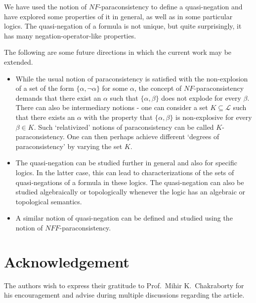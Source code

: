 \documentclass[submission]{eptcs}
\newcommand{\lang}{\mathcal{L}}
\theoremstyle{definition}
\begin{document}
We have used the notion of $NF$-paraconsistency to define a quasi-negation and have explored some properties of it in general, as well as in some particular logics. The quasi-negation of a formula is not unique, but quite surprisingly, it has many negation-operator-like properties.

The following are some future directions in which the current work may be extended.
\begin{itemize}
    \item While the usual notion of paraconsistency is satisfied with the non-explosion of a set of the form $\{\alpha,\neg\alpha\}$ for some $\alpha$, the concept of $NF$-paraconsistency demands that there exist an $\alpha$ such that $\{\alpha,\beta\}$ does not explode for every $\beta$. There can also be intermediary notions - one can consider a set $K\subseteq\lang$ such that there exists an $\alpha$ with the property that $\{\alpha,\beta\}$ is non-explosive for every $\beta\in K$. Such `relativized' notions of paraconsistency can be called $K$-paraconsistency. One can then perhaps achieve different `degrees of paraconsistency' by varying the set $K$.
    \item The quasi-negation can be studied further in general and also for specific logics. In the latter case, this can lead to characterizations of the sets of quasi-negations of a formula in these logics. The quasi-negation can also be studied algebraically or topologically whenever the logic has an algebraic or topological semantics.
    \item A similar notion of quasi-negation can be defined and studied using the notion of $NFF$-pa\-ra\-con\-sis\-ten\-cy.
\end{itemize}

\section*{Acknowledgement}
The authors wish to express their gratitude to Prof.\ Mihir K.\ Chakraborty for his encouragement and advise during multiple discussions regarding the article.



\end{document}
